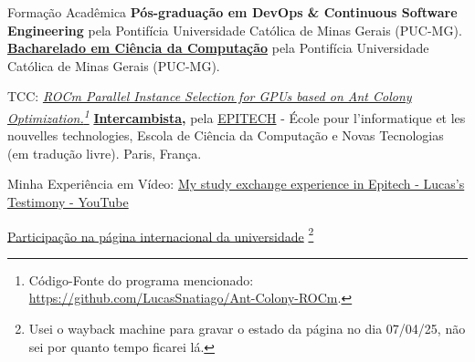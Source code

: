 \begin{rubric}{Formação Acadêmica}
\entry*[2026 -- presente]%
    \textbf{Pós-graduação em DevOps \& Continuous Software Engineering} pela Pontifícia Universidade Católica de Minas Gerais (PUC-MG).
%
\entry*[2019 -- 2023]%
    \textbf{\href{https://drive.google.com/file/d/1c2m8jONNZnZUBY8lnjcAZ_gO1ZWcIsyu/view?usp=sharing}{Bacharelado em Ciência da Computação}} pela Pontifícia Universidade Católica de Minas Gerais (PUC-MG).
    \par TCC: \emph{\href{https://media.githubusercontent.com/media/LucasSnatiago/TCC/main/main.pdf}
    {ROCm Parallel Instance Selection for GPUs based on Ant Colony Optimization.}\footnote{Código-Fonte do programa mencionado: \href{https://github.com/LucasSnatiago/Ant-Colony-ROCm}{https://github.com/LucasSnatiago/Ant-Colony-ROCm}.}}
%
\entry*[2023/1]%
    \textbf{\href{https://drive.google.com/file/d/18yGVDfS8qOwmM7TXN-m8jqI3r0iMvm-3/view?usp=sharing}{Intercambista},} pela \href{https://epitech.eu/}{EPITECH} - École pour l'informatique et les nouvelles technologies, Escola de Ciência da Computação e Novas Tecnologias (em tradução livre). Paris, França. \par
    Minha Experiência em Vídeo: \href{https://youtu.be/rOP5lxGcNaE}{My study exchange experience in Epitech - Lucas's Testimony - YouTube} \par
    \href{https://web.archive.org/web/20250407145959/https://international.epitech.eu/#h-voices-of-our-international-students}{Participação na página internacional da universidade}
    \footnote{Usei o wayback machine para gravar o estado da página no dia 07/04/25, não sei por quanto tempo ficarei lá.}
%
\end{rubric}
